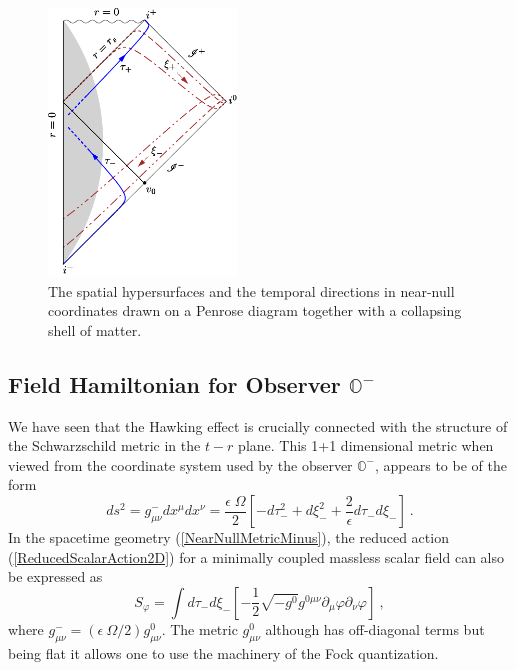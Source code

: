 \documentclass[aps,12pt,showpacs]{revtex4-2}
\def\observerminus{\mathbb{O}^{-}}
\begin{document}

\begin{figure}
\includegraphics[width=5cm]{near-null-collapse.pdf}
\caption{The spatial hypersurfaces and the temporal directions in near-null 
coordinates drawn on a Penrose diagram together with a collapsing shell of 
matter. 
}
\label{fig:NearNullMinusPenrose} 
\end{figure}





\subsection{Field Hamiltonian for Observer $\observerminus$}


We have seen that the Hawking effect is crucially connected with 
the structure of the Schwarzschild metric in the $t-r$ plane. This 
1+1 dimensional metric when viewed from the coordinate system used by
the observer $\observerminus$, appears to be of the form
%
\begin{equation}\label{NearNullMetricMinus}
ds^2 = g^{-}_{\mu\nu}dx^{\mu}dx^{\nu} = \frac{\epsilon\; \Omega}{2}
\left[ -  d\tau_{-}^2 + d\xi_{-}^2 
+\frac{2}{\epsilon} d\tau_{-} d\xi_{-} \right]  ~. 
\end{equation}
%
In the spacetime geometry (\ref{NearNullMetricMinus}), the reduced action 
(\ref{ReducedScalarAction2D}) for a minimally coupled massless scalar field  can 
also be expressed as
%
\begin{equation}\label{ReducedScalarAction2DFlat}
S_{\varphi} =  \int d\tau_{-}  d\xi_{-} \left[-\frac{1}{2} \sqrt{-g^{0}} 
g^{0\mu\nu} \partial_{\mu}\varphi \partial_{\nu} \varphi \right]  ~,
\end{equation}
%
where $g^{-}_{\mu\nu} = (\epsilon ~\Omega/2) g^{0}_{\mu\nu}$. The metric 
$g^{0}_{\mu\nu}$ although has off-diagonal terms but being flat it allows 
one to use the machinery of the Fock quantization. 
\end{document}

